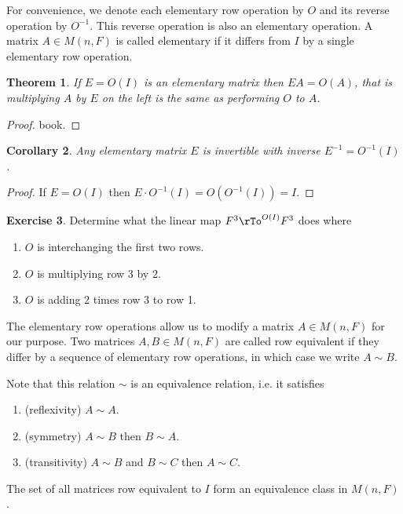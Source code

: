 \documentclass[12pt]{amsart}
\newtheorem{theorem}{Theorem}[section]
\newtheorem{corollary}[theorem]{Corollary}
\theoremstyle{definition}
\newtheorem{exercise}[theorem]{Exercise}
\begin{document}
For convenience, we denote each elementary row operation by $O$ and its reverse operation by $O^{-1}$. This reverse operation is also an elementary operation.
\dfn A matrix $A \in M(n, F)$ is called elementary if it differs from $I$ by a single elementary row operation.

\begin{theorem}\label{EAequalsOA} If $E = O(I)$ is an elementary matrix then $EA = O(A)$, that is multiplying $A$ by $E$ on the left is the same as performing $O$ to $A$.
\end{theorem}
\begin{proof} book.
\end{proof}

\begin{corollary} Any elementary matrix $E$ is invertible with inverse $E^{-1} = O^{-1}(I)$.
\end{corollary}
\begin{proof} If $E = O(I)$ then $E \cdot O^{-1}(I) = O(O^{-1}(I)) = I$.
\end{proof}

\begin{exercise}\label{} Determine what the linear map $F^3 \rTo^{O(I)} F^3$ does where
\begin{enumerate}[\indent a.]
\item $O$ is interchanging the first two rows.
\item $O$ is multiplying row 3 by 2.
\item $O$ is adding 2 times row 3 to row 1.
\end{enumerate}
\end{exercise}

The elementary row operations allow us to modify a matrix $A \in M(n, F)$ for our purpose.
\dfn Two matrices $A, B \in M(n, F)$ are called row equivalent if they differ by a sequence of elementary row operations, in which case we write $A \sim B$.

Note that this relation $\sim$ is an equivalence relation, i.e. it satisfies
\begin{enumerate}[\indent 1.]
\item (reflexivity) $A \sim A$.
\item (symmetry) $A \sim B$ then $B \sim A$.
\item (transitivity) $A \sim B$ and $B \sim C$ then $A \sim C$.
\end{enumerate}

The set of all matrices row equivalent to $I$ form an equivalence class in $M(n, F)$.
\end{document}
